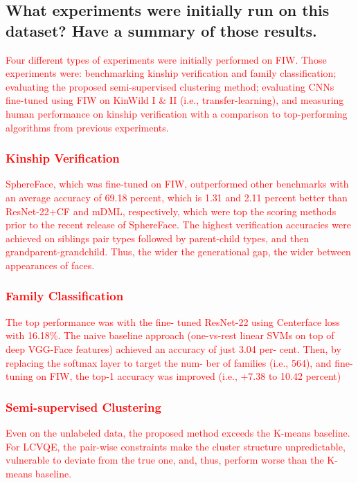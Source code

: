 \subsection*{What experiments were initially run on this dataset? Have a summary of those results.}
\noindent \textcolor{red}{
Four different types of experiments were initially performed on FIW. Those experiments were:  benchmarking kinship verification and family classification; evaluating the proposed semi-supervised clustering method; evaluating CNNs fine-tuned using FIW on KinWild I \& II (i.e., transfer-learning), and measuring human performance on kinship verification with a comparison to top-performing algorithms from previous experiments.} 
\subsubsection*{\textcolor{red}{Kinship Verification}}
\textcolor{red}{
SphereFace, which was fine-tuned on FIW, outperformed other benchmarks with an average accuracy of 69.18 percent, which is 1.31 and 2.11 percent better than ResNet-22+CF and mDML, respectively, which were top the scoring methods prior to the recent release of SphereFace. The highest verification accuracies were achieved on siblings pair types followed by parent-child types, and then grandparent-grandchild. Thus, the wider the generational gap, the wider between appearances of faces.
}

\subsubsection*{\textcolor{red}{Family Classification}}
\textcolor{red}{
The top performance was with the fine- tuned ResNet-22 using Centerface loss with 16.18\%. The naive baseline approach (one-vs-rest linear SVMs on top of deep VGG-Face features) achieved an accuracy of just 3.04 per- cent. Then, by replacing the softmax layer to target the num- ber of families (i.e., 564), and fine-tuning on FIW, the top-1 accuracy was improved (i.e., +7.38 to 10.42 percent)
}

\subsubsection*{\textcolor{red}{Semi-supervised Clustering}}
\textcolor{red}{
Even on the unlabeled data, the proposed method exceeds the K-means baseline. For LCVQE, the pair-wise constraints make the cluster structure unpredictable, vulnerable to deviate from the true one, and, thus, perform worse than the K-means baseline.
}

